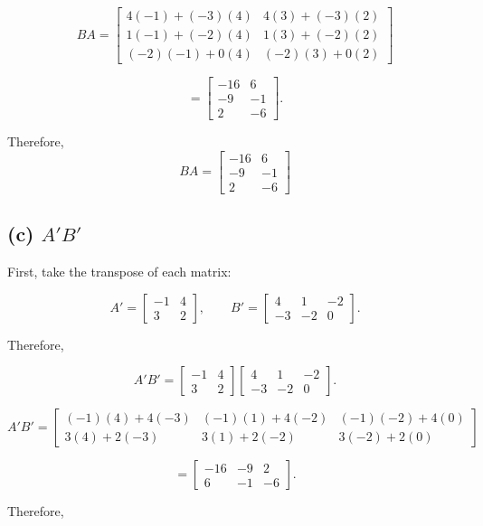 \documentclass[12pt]{article}
\begin{document}
\[
BA
=
\begin{bmatrix}
4(-1)+(-3)(4) & 4(3)+(-3)(2) \\
1(-1)+(-2)(4) & 1(3)+(-2)(2) \\
(-2)(-1)+0(4) & (-2)(3)+0(2)
\end{bmatrix}
\]

\[
=
\begin{bmatrix}
-16 & 6 \\
-9 & -1 \\
2 & -6
\end{bmatrix}.
\]

Therefore,
\[
\boxed{
BA =
\begin{bmatrix}
-16 & 6 \\
-9 & -1 \\
2 & -6
\end{bmatrix}
}
\]

\subsection*{(c) $A'B'$}

First, take the transpose of each matrix:

\[
A'
=
\begin{bmatrix}
-1 & 4 \\
3 & 2
\end{bmatrix},
\qquad
B'
=
\begin{bmatrix}
4 & 1 & -2 \\
-3 & -2 & 0
\end{bmatrix}.
\]

Therefore,

\[
A'B'
=
\begin{bmatrix}
-1 & 4 \\
3 & 2
\end{bmatrix}
\begin{bmatrix}
4 & 1 & -2 \\
-3 & -2 & 0
\end{bmatrix}.
\]

\[
A'B'
=
\begin{bmatrix}
(-1)(4)+4(-3) &
(-1)(1)+4(-2) &
(-1)(-2)+4(0) \\
3(4)+2(-3) &
3(1)+2(-2) &
3(-2)+2(0)
\end{bmatrix}
\]

\[
=
\begin{bmatrix}
-16 & -9 & 2 \\
6 & -1 & -6
\end{bmatrix}.
\]

Therefore,
\end{document}
